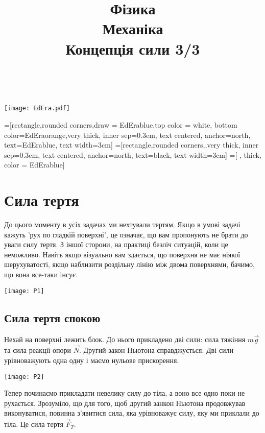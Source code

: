 \documentclass[a4paper,12pt]{article}
\title{\textbf{Фізика} \textbf{\MakeUppercase{\romannumeral1}}\\
	\textbf{Механіка}\\
	\textbf{Концепція сили 3/3}}
\date{}
\author{}
\begin{document}
\thispagestyle{empty}
\textcolor{white}{.}
\vfill
\begin{center} 
\vspace{-6cm} 
\texttt{[image: EdEra.pdf]}
\end{center}
\vfill
\newpage
\maketitle
\vspace{3cm}
\tableofcontents
\newpage


=[rectangle,rounded corners,draw = EdErablue,top color = white, bottom color=EdEraorange,very thick, inner sep=0.3em, text centered, anchor=north, text=EdErablue, text width=3cm]
=[rectangle,rounded corners,,very thick, inner sep=0.3em, text centered, anchor=north, text=black, text width=3cm]
=[-, thick, color = EdErablue]

\newpage
\section{Сила тертя}
До цього моменту в усіх задачах ми нехтували тертям. Якщо в умові задачі кажуть 'рух по гладкій поверхні', це означає, що вам пропонують не брати до уваги силу тертя. З іншої сторони, на практиці безліч ситуацій, коли це неможливо. Навіть якщо візуально вам здається, що поверхня не має ніякої шерухуватості, якщо наблизити роздільну лінію між двома поверхнями, бачимо, що вона все-таки інсує. \begin{center} \texttt{[image: P1]} \end{center}

\subsection{Сила тертя спокою}
Нехай на поверхні лежить блок. До нього прикладено дві сили: сила тяжіння $m\vec{g}$ та сила реакції опори $\vec{N}$. Другий закон Ньютона справджується. Дві сили урівноважують одна одну і маємо нульове прискорення. 
\begin{center} \texttt{[image: P2]} \end{center}

Тепер починаємо прикладати невелику силу до тіла, а воно все одно поки не рухається. Зрозуміло, що для того, щоб другий занкон Ньютона продовжував виконуватися, повинна з'явитися сила, яка урівноважує силу, яку ми приклали до тіла. Це сила тертя $\vec{F}_T$.\\
\end{document}
